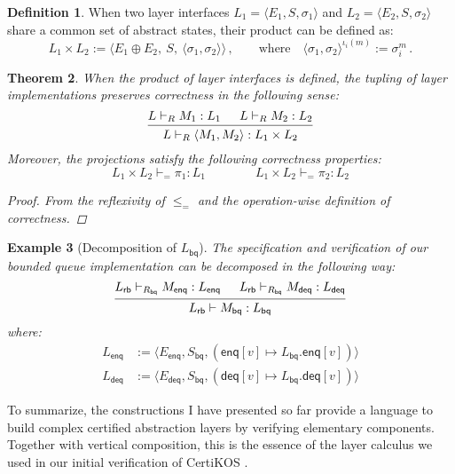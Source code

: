 \documentclass[11pt,oneside]{book}
\newtheorem{theorem}{Theorem}[chapter]
\newtheorem{example}[theorem]{Example}
\theoremstyle{definition}
\newtheorem{definition}[theorem]{Definition}
\newcommand{\kw}[1]{\ensuremath{ \mathsf{#1} }}
\begin{document}
\begin{definition}
When two layer interfaces
$L_1 = \langle E_1, S, \sigma_1 \rangle$ and
$L_2 = \langle E_2, S, \sigma_2 \rangle$
share a common set of abstract states,
their product can be defined as:
\[
  L_1 \times L_2 :=
    \langle
      E_1 \oplus E_2, \:
      S, \:
      \langle \sigma_1, \sigma_2 \rangle
    \rangle \,,
  \qquad
  \text{where}
  \quad
  \langle \sigma_1, \sigma_2 \rangle^{\iota_i(m)} := \sigma_i^m \,.
\]
\end{definition}

\begin{theorem}
When the product of layer interfaces is defined,
the tupling of layer implementations
preserves correctness in the following sense:
\[
  \begin{prooftree}
    \hypo{L \vdash_R M_1 : L_1}
    \hypo{L \vdash_R M_2 : L_2}
    \infer2{L \vdash_R \langle M_1, M_2 \rangle : L_1 \times L_2}
  \end{prooftree}
\]
Moreover, the projections satisfy the following correctness properties:
\[
   L_1 \times L_2 \vdash_{=} \pi_1 : L_1 \qquad \qquad
   L_1 \times L_2 \vdash_{=} \pi_2 : L_2
\]
\begin{proof}
From the reflexivity of $\le_=$ and
the operation-wise definition of correctness.
\end{proof}
\end{theorem}

\begin{example}[Decomposition of $L_\kw{bq}$]
The specification and verification of
our bounded queue implementation can be decomposed
in the following way:
\[
  \begin{prooftree}
    \hypo{L_\kw{rb} \vdash_{R_\kw{bq}} M_\kw{enq} : L_\kw{enq}}
    \hypo{L_\kw{rb} \vdash_{R_\kw{bq}} M_\kw{deq} : L_\kw{deq}}
    \infer2{L_\kw{rb} \vdash M_\kw{bq} : L_\kw{bq}}
  \end{prooftree}
\]
where:
\begin{align*}
  L_\kw{enq} &:=
    \langle E_\kw{enq}, S_\kw{bq},
      (\kw{enq}[v] \mapsto L_\kw{bq}.\kw{enq}[v]) \rangle \\
  L_\kw{deq} &:=
    \langle E_\kw{deq}, S_\kw{bq},
      (\kw{deq}[v] \mapsto L_\kw{bq}.\kw{deq}[v]) \rangle
\end{align*}
\end{example}

To summarize,
the constructions I have presented so far
provide a language to build
complex certified abstraction layers
by verifying elementary components.
Together with vertical composition,
this is the essence of the layer calculus
we used in our initial verification of CertiKOS
\citep{popl15}.
\end{document}
